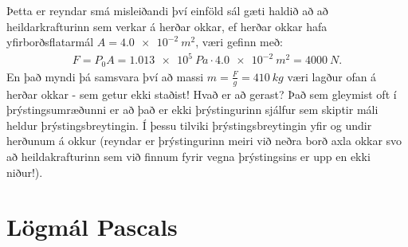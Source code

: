 \ifdefined \wholebook \else\documentclass[oneside]{book}\usepackage{EdlBook}\graphicspath{{figures/}}
\begin{document}
Þetta er reyndar smá misleiðandi því einföld sál gæti haldið að að heildarkrafturinn sem verkar á herðar okkar, ef herðar okkar hafa yfirborðsflatarmál $A = \SI{4.0e-2}{m^2}$, væri gefinn með:
\begin{align*}
    F = P_0 A = \SI{1.013e5}{Pa} \cdot \SI{4.0e-2}{m^2} = \SI{4000}{N}.
\end{align*}
En það myndi þá samsvara því að massi $m = \frac{F}{g} = \SI{410}{kg}$ væri lagður ofan á herðar okkar - sem getur ekki staðist! Hvað er að gerast? Það sem gleymist oft í þrýstingsumræðunni er að það er ekki þrýstingurinn sjálfur sem skiptir máli heldur þrýstingsbreytingin. Í þessu tilviki þrýstingsbreytingin yfir og undir herðunum á okkur (reyndar er þrýstingurinn meiri við neðra borð axla okkar svo að heildakrafturinn sem við finnum fyrir vegna þrýstingsins er upp en ekki niður!).


\newpage

\section{Lögmál Pascals}
\end{document}
